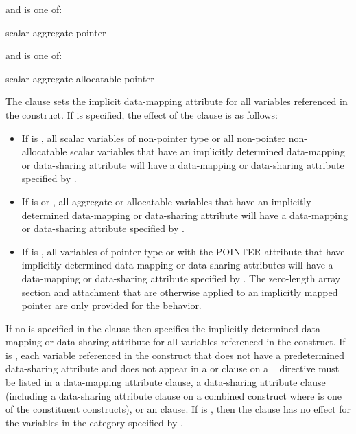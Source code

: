 \begin{ccppspecific}
and  is one of:
\begin{indentedcodelist}
  scalar
  aggregate
  pointer
\end{indentedcodelist}
\end{ccppspecific}

\begin{fortranspecific}
and  is one of:
\begin{indentedcodelist}
  scalar
  aggregate
  allocatable
  pointer
\end{indentedcodelist}
\end{fortranspecific}

\descr
The  clause sets the implicit data-mapping attribute for all variables
referenced in the construct. If  is specified, the effect of
the  clause is as follows:

\begin{itemize}
\item If  is , all scalar variables of
      non-pointer type or all non-pointer non-allocatable scalar variables that
      have an implicitly determined data-mapping or data-sharing attribute will
      have a data-mapping or data-sharing attribute specified by
      .
\item If  is  or ,
      all aggregate or allocatable variables that have an implicitly determined
      data-mapping or data-sharing attribute will have a data-mapping or
      data-sharing attribute specified by .
\item If  is , all variables of pointer
      type or with the POINTER attribute that have implicitly determined
      data-mapping or data-sharing attributes will have a data-mapping or
      data-sharing attribute specified by .  The
      zero-length array section and attachment that are otherwise applied to
      an implicitly mapped pointer are only provided for the  behavior.
\end{itemize}

If no  is specified in the clause then
 specifies the implicitly determined data-mapping or
data-sharing attribute for all variables referenced in the construct.  If
 is , each variable referenced in the
construct that does not have a predetermined data-sharing attribute and does
not appear in a  or  clause on a ~
directive must be listed in a data-mapping attribute clause, a data-sharing
attribute clause (including a data-sharing attribute clause on a combined
construct where  is one of the constituent constructs), or
an  clause. If  is ,
then the clause has no effect for the variables in the category specified by
.



